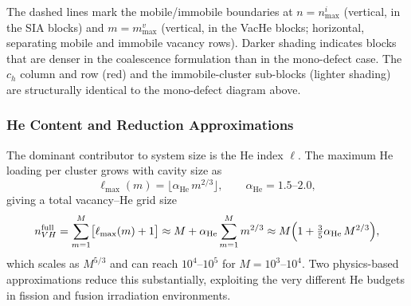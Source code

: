 \begin{center}
\end{center}

\noindent
The dashed lines mark the mobile/immobile boundaries at $n = n_{\max}^i$
(vertical, in the SIA blocks) and $m = m_{\max}^v$ (vertical, in the
VacHe blocks; horizontal, separating mobile and immobile vacancy rows).
Darker shading indicates blocks that are denser in the coalescence
formulation than in the mono-defect case. The $c_h$ column and row
(red) and the immobile-cluster sub-blocks (lighter shading) are
structurally identical to the mono-defect diagram above.

\subsubsection{He Content and Reduction Approximations}
\label{sec:He_approx}

The dominant contributor to system size is the He index $\ell$. The
maximum He loading per cluster grows with cavity size as
\begin{equation}\label{eq:ellmax}
    \ell_{\max}(m) = \lfloor \alpha_{\mathrm{He}}\,m^{2/3} \rfloor,
    \qquad \alpha_{\mathrm{He}} = 1.5\text{--}2.0,
\end{equation}
giving a total vacancy--He grid size
\begin{equation}\label{eq:nVH_full}
    n_{VH}^{\mathrm{full}}
    = \sum_{m=1}^{M}\bigl[\ell_{\max}(m)+1\bigr]
    \approx M + \alpha_{\mathrm{He}}\sum_{m=1}^{M} m^{2/3}
    \approx M\Bigl(1 + \tfrac{3}{5}\alpha_{\mathrm{He}}\,M^{2/3}\Bigr),
\end{equation}
which scales as $M^{5/3}$ and can reach $10^4$--$10^5$ for
$M = 10^3$--$10^4$. Two physics-based approximations reduce this
substantially, exploiting the very different He budgets in fission and
fusion irradiation environments.

